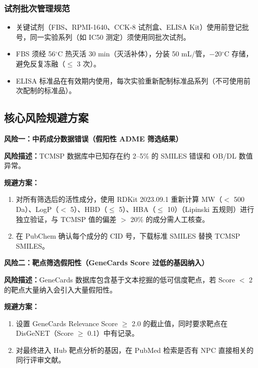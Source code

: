 \documentclass[12pt,a4paper,twoside]{article}
\begin{document}
\subsubsection{试剂批次管理规范}

\begin{itemize}
  \item 关键试剂（FBS、RPMI-1640、CCK-8 试剂盒、ELISA Kit）使用前登记批号，同一实验系列（如 IC50 测定）须使用同批次试剂。
  \item FBS 须经 56$^{\circ}$C 热灭活 30 min（灭活补体），分装 50 mL/管，$-$20$^{\circ}$C 存储，避免反复冻融（$\leq$ 3 次）。
  \item ELISA 标准品在有效期内使用，每次实验重新配制标准品系列（不可使用前次配制的标准品）。
\end{itemize}

\subsection{核心风险规避方案}
\label{sec:module9_risk}

\begin{warningbox}
\textbf{风险一：中药成分数据错误（假阳性 ADME 筛选结果）}

\textbf{风险描述：}TCMSP 数据库中已知存在约 2--5\% 的 SMILES 错误和 OB/DL 数值异常。

\textbf{规避方案：}
\begin{enumerate}
  \item 对所有筛选后的活性成分，使用 RDKit 2023.09.1 重新计算 MW（$<$ 500 Da）、LogP（$<$ 5）、HBD（$\leq$ 5）、HBA（$\leq$ 10）（Lipinski 五规则）进行独立验证，与 TCMSP 值的偏差 $>$ 20\% 的成分需人工核查。
  \item 在 PubChem 确认每个成分的 CID 号，下载标准 SMILES 替换 TCMSP SMILES。
\end{enumerate}
\end{warningbox}

\begin{warningbox}
\textbf{风险二：靶点筛选假阳性（GeneCards Score 过低的基因纳入）}

\textbf{风险描述：}GeneCards 数据库包含基于文本挖掘的低可信度靶点，若 Score $<$ 2 的靶点大量纳入会引入大量假阳性。

\textbf{规避方案：}
\begin{enumerate}
  \item 设置 GeneCards Relevance Score $\geq$ 2.0 的截止值，同时要求靶点在 DisGeNET（Score $\geq$ 0.1）中有记录。
  \item 对最终进入 Hub 靶点分析的基因，在 PubMed 检索是否有 NPC 直接相关的同行评审文献。
\end{enumerate}
\end{warningbox}
\end{document}
